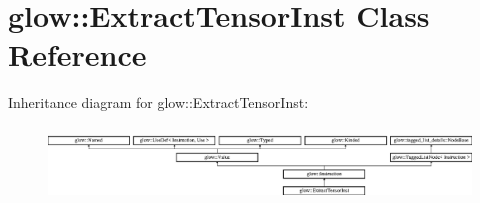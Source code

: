 \hypertarget{classglow_1_1_extract_tensor_inst}{}\section{glow\+:\+:Extract\+Tensor\+Inst Class Reference}
\label{classglow_1_1_extract_tensor_inst}
Inheritance diagram for glow\+:\+:Extract\+Tensor\+Inst\+:\begin{figure}[H]
\begin{center}
\leavevmode
\includegraphics[height=1.991111cm]{classglow_1_1_extract_tensor_inst}
\end{center}
\end{figure}
